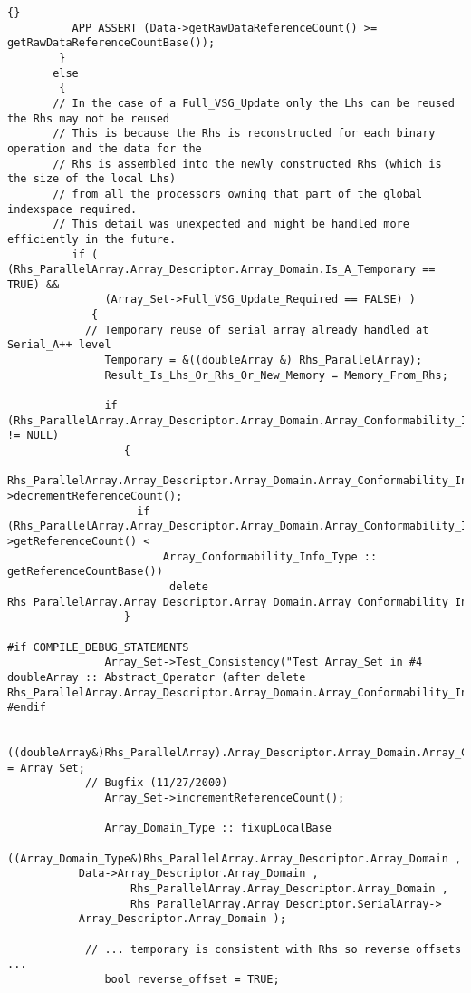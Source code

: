 \documentclass[10pt]{llncs}
\begin{document}
\begin{lstlisting}{}
          APP_ASSERT (Data->getRawDataReferenceCount() >= getRawDataReferenceCountBase());
        }
       else
        {
       // In the case of a Full_VSG_Update only the Lhs can be reused the Rhs may not be reused
       // This is because the Rhs is reconstructed for each binary operation and the data for the
       // Rhs is assembled into the newly constructed Rhs (which is the size of the local Lhs)
       // from all the processors owning that part of the global indexspace required.
       // This detail was unexpected and might be handled more efficiently in the future.
          if ( (Rhs_ParallelArray.Array_Descriptor.Array_Domain.Is_A_Temporary == TRUE) && 
               (Array_Set->Full_VSG_Update_Required == FALSE) )
             {
            // Temporary reuse of serial array already handled at Serial_A++ level
               Temporary = &((doubleArray &) Rhs_ParallelArray);
               Result_Is_Lhs_Or_Rhs_Or_New_Memory = Memory_From_Rhs;

               if (Rhs_ParallelArray.Array_Descriptor.Array_Domain.Array_Conformability_Info != NULL)
                  {
                    Rhs_ParallelArray.Array_Descriptor.Array_Domain.Array_Conformability_Info->decrementReferenceCount();
                    if (Rhs_ParallelArray.Array_Descriptor.Array_Domain.Array_Conformability_Info->getReferenceCount() < 
                        Array_Conformability_Info_Type :: getReferenceCountBase())
                         delete Rhs_ParallelArray.Array_Descriptor.Array_Domain.Array_Conformability_Info;
                  }

#if COMPILE_DEBUG_STATEMENTS
               Array_Set->Test_Consistency("Test Array_Set in #4 doubleArray :: Abstract_Operator (after delete Rhs_ParallelArray.Array_Descriptor.Array_Domain.Array_Conformability_Info)");
#endif

               ((doubleArray&)Rhs_ParallelArray).Array_Descriptor.Array_Domain.Array_Conformability_Info = Array_Set;
            // Bugfix (11/27/2000)
               Array_Set->incrementReferenceCount();

               Array_Domain_Type :: fixupLocalBase 
		  ((Array_Domain_Type&)Rhs_ParallelArray.Array_Descriptor.Array_Domain , 
		   Data->Array_Descriptor.Array_Domain , 
                   Rhs_ParallelArray.Array_Descriptor.Array_Domain , 
                   Rhs_ParallelArray.Array_Descriptor.SerialArray->
		   Array_Descriptor.Array_Domain );

            // ... temporary is consistent with Rhs so reverse offsets ...
               bool reverse_offset = TRUE;


\end{lstlisting}
\end{document}
